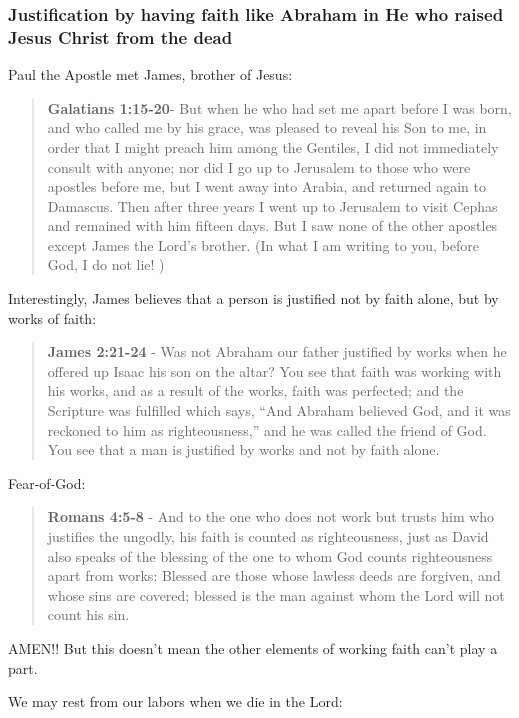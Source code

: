 \documentclass[11pt]{article}
\begin{document}
\subsubsection{Justification by having faith like Abraham in He who raised Jesus Christ from the dead}
\label{sec:orgeef9d5d}
Paul the Apostle met James, brother of Jesus:

\begin{quote}
\textbf{Galatians 1:15-20}- But when he who had set me apart before I was born, and who called me by his grace, was pleased to reveal his Son to me, in order that I might preach him among the Gentiles, I did not immediately consult with anyone; nor did I go up to Jerusalem to those who were apostles before me, but I went away into Arabia, and returned again to Damascus. Then after three years I went up to Jerusalem to visit Cephas and remained with him fifteen days. But I saw none of the other apostles except James the Lord's brother. (In what I am writing to you, before God, I do not lie! )
\end{quote}

Interestingly, James believes that a person is justified not by faith alone, but by works of faith:

\begin{quote}
\textbf{James 2:21-24} - Was not Abraham our father justified by works when he offered up Isaac his son on the altar? You see that faith was working with his works, and as a result of the works, faith was perfected; and the Scripture was fulfilled which says, “And Abraham believed God, and it was reckoned to him as righteousness,” and he was called the friend of God. You see that a man is justified by works and not by faith alone.
\end{quote}

Fear-of-God:

\begin{quote}
\textbf{Romans 4:5-8} - And to the one who does not work but trusts him who justifies the ungodly, his faith is counted as righteousness, just as David also speaks of the blessing of the one to whom God counts righteousness apart from works: Blessed are those whose lawless deeds are forgiven, and whose sins are covered; blessed is the man against whom the Lord will not count his sin.
\end{quote}

AMEN!! But this doesn't mean the other elements of working faith can't play a part.

We may rest from our labors when we die in the Lord:
\end{document}
